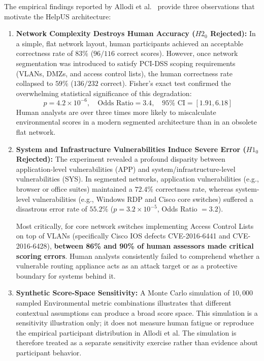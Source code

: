 The empirical findings reported by Allodi et al.~\cite{santos2017estimating} provide three observations that motivate the HelpUS architecture:
\begin{enumerate}
    \item \textbf{Network Complexity Destroys Human Accuracy ($H2_0$ Rejected):}
    In a simple, flat network layout, human participants achieved an acceptable correctness rate of $83\%$ ($96/116$ correct scores). However, once network segmentation was introduced to satisfy PCI-DSS scoping requirements (VLANs, DMZs, and access control lists), the human correctness rate collapsed to $59\%$ ($136/232$ correct). Fisher's exact test confirmed the overwhelming statistical significance of this degradation:
    \begin{equation}
        p = 4.2 \times 10^{-6}, \quad \text{Odds Ratio} = 3.4, \quad 95\% \text{ CI} = [1.91, 6.18]
    \end{equation}
    Human analysts are over three times more likely to miscalculate environmental scores in a modern segmented architecture than in an obsolete flat network.

    \item \textbf{System and Infrastructure Vulnerabilities Induce Severe Error ($H1_0$ Rejected):}
    The experiment revealed a profound disparity between application-level vulnerabilities (APP) and system/infrastructure-level vulnerabilities (SYS). In segmented networks, application vulnerabilities (e.g., browser or office suites) maintained a $72.4\%$ correctness rate, whereas system-level vulnerabilities (e.g., Windows RDP and Cisco core switches) suffered a disastrous error rate of $55.2\%$ ($p = 3.2 \times 10^{-5}$, Odds Ratio $= 3.2$).
    
    Most critically, for core network switches implementing Access Control Lists on top of VLANs (specifically Cisco IOS defects CVE-2016-6441 and CVE-2016-6428), \textbf{between 86\% and 90\% of human assessors made critical scoring errors}. Human analysts consistently failed to comprehend whether a vulnerable routing appliance acts as an attack target or as a protective boundary for systems behind it.

    \item \textbf{Synthetic Score-Space Sensitivity:}
    A Monte Carlo simulation of $10,000$ sampled Environmental metric combinations illustrates that different contextual assumptions can produce a broad score space. This simulation is a sensitivity illustration only; it does not measure human fatigue or reproduce the empirical participant distribution in Allodi et al. The simulation is therefore treated as a separate sensitivity exercise rather than evidence about participant behavior.
\end{enumerate}

